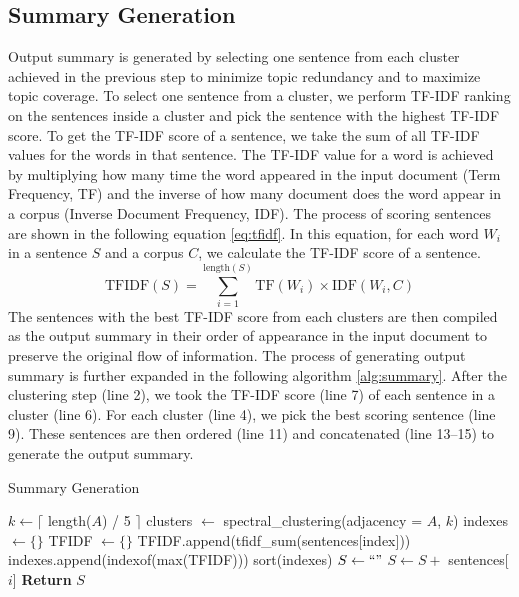\subsection{Summary Generation}\label{subsec:summary-generation}
Output summary is generated by selecting one sentence from each cluster achieved in the previous step to minimize topic redundancy and to maximize topic coverage. To select one sentence from a cluster, we perform TF-IDF ranking on the sentences inside a cluster and pick the sentence with the highest TF-IDF score. To get the TF-IDF score of a sentence, we take the sum of all TF-IDF values for the words in that sentence. The TF-IDF value for a word is achieved by multiplying how many time the word appeared in the input document (Term Frequency, TF) and the inverse of how many document does the word appear in a corpus (Inverse Document Frequency, IDF). The process of scoring sentences are shown in the following equation \ref{eq:tfidf}. In this equation, for each word $W_i$ in a sentence $S$ and a corpus $C$, we calculate the TF-IDF score of a sentence.
\begin{equation}\label{eq:tfidf}
	\text{TFIDF}(S) = \sum_{i=1}^{\text{length}(S)}\text{TF}(W_i) \times \text{IDF}(W_i,C)	
\end{equation}
The sentences with the best TF-IDF score from each clusters are then compiled as the output summary in their order of appearance in the input document to preserve the original flow of information. The process of generating output summary is further expanded in the following algorithm \ref{alg:summary}. After the clustering step (line 2), we took the TF-IDF score (line 7) of each sentence in a cluster (line 6). For each cluster (line 4), we pick the best scoring sentence (line 9). These sentences are then ordered (line 11) and concatenated (line 13--15) to generate the output summary.

\begin{algorithm} \caption{Summary Generation} \label{alg:summary}
\begin{algorithmic}[1]
    \State $k \gets \lceil$ length($A$) / 5 $\rceil$
    \State clusters $\gets$ spectral\_clustering(adjacency = $A$, $k$)
    \State indexes $\gets \{\}$
        \State TFIDF $\gets \{\}$
            \State TFIDF.append(tfidf\_sum(sentences[index]))
        \EndFor
        \State indexes.append(indexof(max(TFIDF)))
    \EndFor
    \State sort(indexes)
    \State $S \gets `` "$
        \State $S \gets S +$ sentences[$i$]
    \EndFor
    \State \textbf{Return} $S$
\end{algorithmic}
\end{algorithm}

